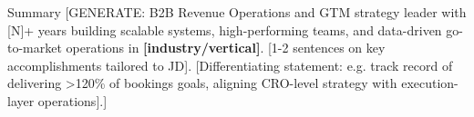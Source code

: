 \documentclass{resume}
\begin{document}
%
%
%
%

\vspace{-0.15cm}

\begin{rSection}{Summary}
[GENERATE: B2B Revenue Operations and GTM strategy leader with [N]+ years building scalable systems, high-performing teams, and data-driven go-to-market operations in \textbf{[industry/vertical]}. [1-2 sentences on key accomplishments tailored to JD]. [Differentiating statement: e.g. track record of delivering >120\% of bookings goals, aligning CRO-level strategy with execution-layer operations].]
\end{rSection}
\vspace{-0.15cm}
\end{document}
